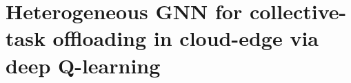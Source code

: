 \chapter{Heterogeneous GNN for collective-task offloading in cloud-edge via deep Q-learning}
\label{chap:heterogeneous-gnn}
